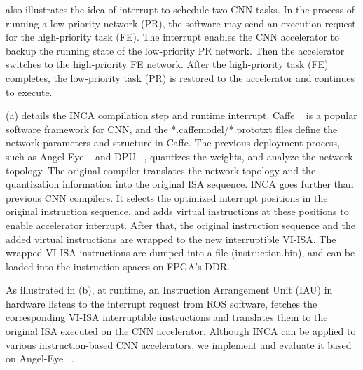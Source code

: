  also illustrates the idea of interrupt to schedule two CNN tasks. In the process of running a low-priority network (PR), the software may send an execution request for the high-priority task (FE). The interrupt enables the CNN accelerator to backup the running state of the low-priority PR network. Then the accelerator switches to the high-priority FE network. After the high-priority task (FE) completes, the low-priority task (PR) is restored to the accelerator and continues to execute.


(a) details the INCA compilation step and runtime interrupt. Caffe  ~\cite{jia2014caffe} is a popular software framework for CNN, and the *.caffemodel/*.prototxt files define the network parameters and structure in Caffe. The previous deployment process, such as Angel-Eye  ~\cite{guo2017angel} and DPU ~\cite{dpu}, quantizes the weights, and analyze the network topology. The original compiler translates the network topology and the quantization information into the original ISA sequence. INCA goes further than previous CNN compilers. It selects the optimized interrupt positions in the original instruction sequence, and adds virtual instructions at these positions to enable accelerator interrupt. After that, the original instruction sequence and the added virtual instructions are wrapped to the new interruptible VI-ISA. The wrapped VI-ISA instructions are dumped into a file (instruction.bin), and can be loaded into the instruction spaces on FPGA's DDR.


As illustrated in (b), at runtime, an Instruction Arrangement Unit (IAU) in hardware listens to the interrupt request from ROS software, fetches the corresponding VI-ISA interruptible instructions and translates them to the original ISA executed on the CNN accelerator. 
Although INCA can be applied to various instruction-based CNN accelerators, we implement and evaluate it based on Angel-Eye  ~\cite{guo2017angel}.


